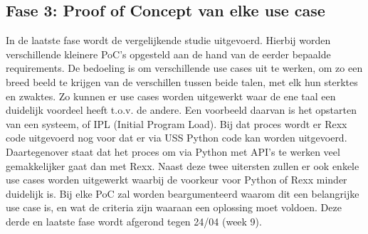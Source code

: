
\subsection{Fase 3: Proof of Concept van elke use case}

In de laatste fase wordt de vergelijkende studie uitgevoerd. Hierbij worden verschillende kleinere PoC's opgesteld aan de hand van de eerder bepaalde requirements. De bedoeling is om verschillende use cases uit te werken, om zo een breed beeld te krijgen van de verschillen tussen beide talen, met elk hun sterktes en zwaktes. Zo kunnen er use cases worden uitgewerkt waar de ene taal een duidelijk voordeel heeft t.o.v. de andere. Een voorbeeld daarvan is het opstarten van een systeem, of IPL (Initial Program Load). Bij dat proces wordt er Rexx code uitgevoerd nog voor dat er via USS Python code kan worden uitgevoerd. Daartegenover staat dat het proces om via Python met API's te werken veel gemakkelijker gaat dan met Rexx. Naast deze twee uitersten zullen er ook enkele use cases worden uitgewerkt waarbij de voorkeur voor Python of Rexx minder duidelijk is. Bij elke PoC zal worden beargumenteerd waarom dit een belangrijke use case is, en wat de criteria zijn waaraan een oplossing moet voldoen. Deze derde en laatste fase wordt afgerond tegen 24/04 (week 9).

